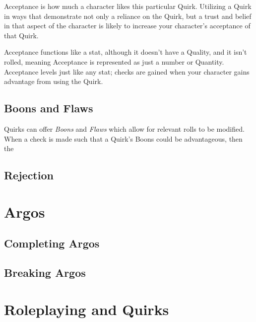 \documentclass[../main.tex]{subfiles}
\begin{document}
    Acceptance is how much a character likes this particular Quirk. Utilizing a Quirk in ways that demonstrate not only a reliance on the Quirk, but a trust and belief in that aspect of the character is likely to increase your character's acceptance of that Quirk. 
    
    Acceptance functions like a stat, although it doesn't have a Quality, and it isn't rolled, meaning Acceptance is represented as just a number or Quantity. Acceptance levels just like any stat; checks are gained when your character gains advantage from using the Quirk. 

    \subsection{Boons and Flaws}

    Quirks can offer \emph{Boons} and \emph{Flaws} which allow for relevant rolls to be modified. When a check is made such that a Quirk's Boons could be advantageous, then the 

    
    \subsection{Rejection}



    \section{Argos}

    \subsection{Completing Argos}

    \subsection{Breaking Argos}

    \section{Roleplaying and Quirks}
\end{document}
